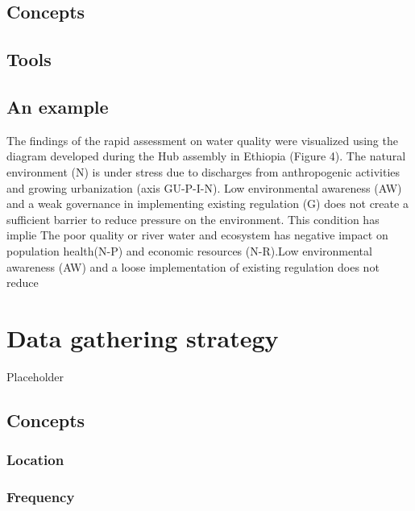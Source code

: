 \documentclass[
]{book}
\begin{document}
\hypertarget{concepts-3}{%
\section{Concepts}\label{concepts-3}}

\hypertarget{tools-3}{%
\section{Tools}\label{tools-3}}

\hypertarget{an-example-2}{%
\section{An example}\label{an-example-2}}

The findings of the rapid assessment on water quality were visualized using the diagram developed during the Hub assembly in Ethiopia (Figure 4). The natural environment (N) is under stress due to discharges from anthropogenic activities and growing urbanization (axis GU-P-I-N). Low environmental awareness (AW) and a weak governance in implementing existing regulation (G) does not create a sufficient barrier to reduce pressure on the environment. This condition has implie The poor quality or river water and ecosystem has negative impact on population health(N-P) and economic resources (N-R).Low environmental awareness (AW) and a loose implementation of existing regulation does not reduce

\hypertarget{data-gathering-strategy}{%
\chapter{Data gathering strategy}\label{data-gathering-strategy}}

Placeholder

\hypertarget{concepts-4}{%
\section{Concepts}\label{concepts-4}}

\hypertarget{location}{%
\subsection{Location}\label{location}}

\hypertarget{frequency}{%
\subsection{Frequency}\label{frequency}}
\end{document}
